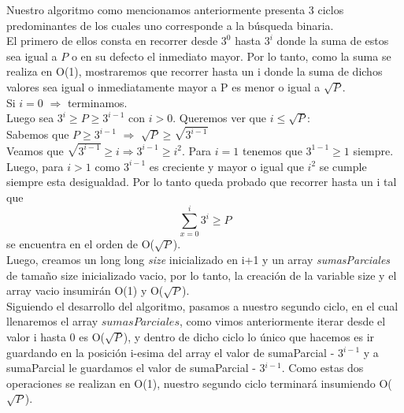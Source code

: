 
Nuestro algoritmo como mencionamos anteriormente presenta 3 ciclos predominantes de los cuales uno corresponde a la b\'usqueda binaria.\\
El primero de ellos consta en recorrer desde $3^0$ hasta $3^i$ donde la suma de estos sea igual a $P$ o en su defecto el inmediato mayor. Por lo tanto, como la suma se realiza en O(1), mostraremos que recorrer hasta un i donde la suma de dichos valores sea igual o inmediatamente mayor a P es menor o igual a $\sqrt{P}$.\\

Si $i = 0$ $\Rightarrow$ terminamos.\\
Luego sea $3^i \geq P \geq 3^{i-1}$ con $i > 0$. Queremos ver que $i \leq \sqrt{P}$:\\
Sabemos que $P \geq 3^{i-1}$ $\Rightarrow$ $\sqrt{P} \geq \sqrt{3^{i-1}}$\\
Veamos que $\sqrt{3^{i-1}} \geq i \Rightarrow 3^{i-1} \geq {i^2}$. Para $i = 1$ tenemos que $3^{1-1} \geq 1$ siempre. Luego, para $i > 1$ como ${3^{i-1}}$ es creciente y mayor o igual que $i^2$ se cumple siempre esta desigualdad. Por lo tanto queda probado que recorrer hasta un i tal que \[
\sum_{x=0}^{i}3^{i} \geq P \] se encuentra en el orden de  O($\sqrt{P}$).\\

 Luego, creamos un long long \textit{size} inicializado en i+1 y un array \textit{sumasParciales} de tamaño size inicializado vacio, por lo tanto, la creaci\'on de la variable size y el array vacio insumir\'an O(1) y O($\sqrt{P}$).\\
 
Siguiendo el desarrollo del algoritmo, pasamos a nuestro segundo ciclo, en el cual llenaremos el array $sumasParciales$, como vimos anteriormente iterar desde el valor i hasta 0 es O($\sqrt{P}$), y dentro de dicho ciclo lo \'unico que hacemos es ir guardando en la posici\'on i-esima del array el valor de sumaParcial - 3$^{i-1}$ y a sumaParcial le guardamos el valor de sumaParcial - 3$^{i-1}$. Como estas dos operaciones se realizan en O(1), nuestro segundo ciclo terminar\'a insumiendo O($\sqrt{P}$).\\

